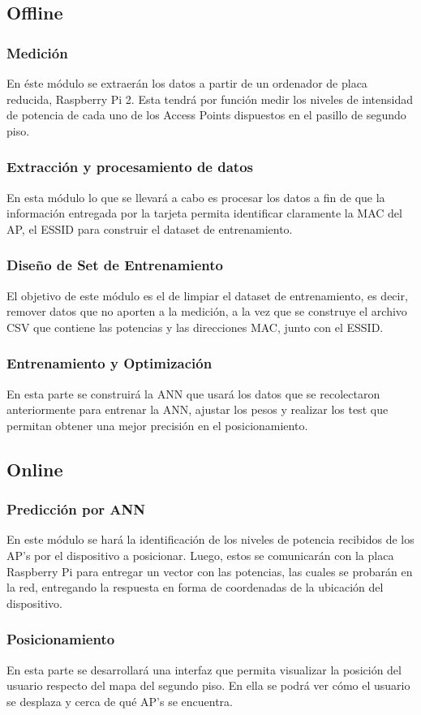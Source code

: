 \subsection{Offline}
\subsubsection{Medición}

En éste módulo se extraerán los datos a partir de un ordenador de placa reducida, Raspberry Pi 2. Esta tendrá por función medir los niveles de intensidad de potencia de cada uno de los Access Points dispuestos en el pasillo de segundo piso.

\subsubsection{Extracción y procesamiento de datos}
En esta módulo lo que se llevará a cabo es procesar los datos a fin de que la información entregada por la tarjeta permita identificar claramente la MAC del AP, el \ac{ESSID} para construir el dataset de entrenamiento.

\subsubsection{Diseño de Set de Entrenamiento}

El objetivo de este módulo es el de limpiar el dataset de entrenamiento, es decir, remover datos que no aporten a la medición, a la vez que se construye el archivo CSV que contiene las potencias y las direcciones MAC, junto con el ESSID.

\subsubsection{Entrenamiento y Optimización}
En esta parte se construirá la ANN que usará los datos que se recolectaron anteriormente para entrenar la ANN, ajustar los pesos y realizar los test que permitan obtener una mejor precisión en el posicionamiento.

\subsection{Online}

\subsubsection{Predicción por ANN}
En este módulo se hará la identificación de los niveles de potencia recibidos de los AP's por el dispositivo a posicionar.
Luego, estos se comunicarán con la placa Raspberry Pi para entregar un vector con las potencias, las cuales se probarán en la red, entregando la respuesta en forma de coordenadas de la ubicación del dispositivo.

\subsubsection{Posicionamiento}
En esta parte se desarrollará una interfaz que permita visualizar la posición del usuario respecto del mapa del segundo piso. En ella se podrá ver cómo el usuario se desplaza y cerca de qué AP's se encuentra.

